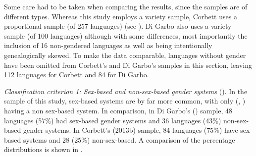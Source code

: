 \documentclass[output=collectionpaper]{langsci/langscibook}
\begin{document}
Some care had to be taken when comparing the results, since the samples are of different types. Whereas this study employs a variety sample, Corbett uses a proportional sample (of 257 languages) (see ). Di Garbo also uses a variety sample (of 100 languages) although with some differences, most importantly the inclusion of 16 non-gendered languages as well as being intentionally genealogically skewed. To make the data comparable, languages without gender have been omitted from Corbett's and Di Garbo's samples in this section, leaving 112 languages for Corbett and 84 for Di Garbo.



\textit{Classification criterion 1: Sex-based and non-sex-based gender systems} ().
In the sample of this study, sex-based
 systems are by far more common, with only  (, ) having a non sex-based system. In comparison, in Di Garbo's (\citeyear[63]{DiGarbo2014}) sample, 48 languages (57\%) had sex-based gender systems and 36 languages (43\%) non-sex-based gender systems. In Corbett's (2013b) sample, 84 languages (75\%) have sex-based systems and 28 (25\%) non-sex-based. A comparison of the percentage distributions is shown in .
\end{document}
